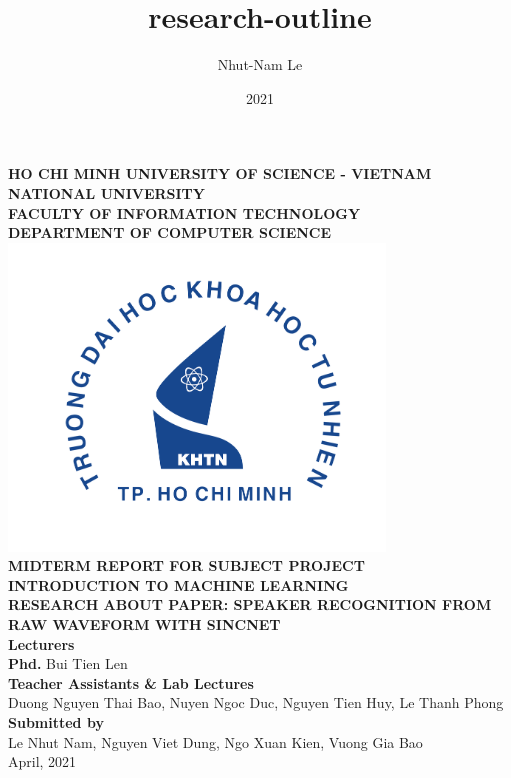 \documentclass{article}
\title{research-outline}
\author{Nhut-Nam Le}
\date{2021}
\begin{document}
	\begin{titlepage}
		\begin{center}
			\large{\textbf{HO CHI MINH UNIVERSITY OF SCIENCE - VIETNAM NATIONAL UNIVERSITY\\FACULTY OF INFORMATION TECHNOLOGY\\DEPARTMENT OF COMPUTER SCIENCE}}\\
			\includegraphics[width=0.75\textwidth]{images/khtn.png}\\
			\large \textbf{MIDTERM REPORT FOR SUBJECT PROJECT}\\[0.1in]
			\huge \textbf{INTRODUCTION TO MACHINE LEARNING}\\[0.1in]
			\huge \textbf{RESEARCH ABOUT PAPER: \newline SPEAKER RECOGNITION FROM RAW WAVEFORM WITH SINCNET}\\[0.1in]
			\vfill
			\normalsize
			\normalsize
			\textbf{Lecturers}\\
			{\textbf{Phd.} Bui Tien Len}\\[0.1in]
			\textbf{Teacher Assistants \& Lab Lectures}\\
			\vspace{0.1in}
			{Duong Nguyen Thai Bao, Nuyen Ngoc Duc, Nguyen Tien Huy, Le Thanh Phong}\\[0.1in]
			\textbf{Submitted by} \\
			\vspace{0.1in}
			{Le Nhut Nam, Nguyen Viet Dung, Ngo Xuan Kien, Vuong Gia Bao}\\[0.1in]
			\vfill
			April, 2021
		\end{center}
	\end{titlepage}
	\newpage
	
\end{document}

